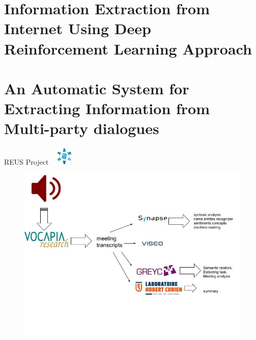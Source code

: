 \documentclass{beamer}
\begin{document}
\begin{frame}\frametitle{}

\end{frame}

\section{Information Extraction from Internet Using Deep Reinforcement Learning Approach}
\begin{frame}

\end{frame}

\begin{frame}

\end{frame}

\section{An Automatic System for Extracting Information from Multi-party dialogues}
\begin{frame}{REUS Project \hspace*{7.1cm}~ \includegraphics[width=0.8cm]{images/reus.png}}

\begin{figure}
\includegraphics[width=12cm]{images/reus-.jpg}
\end{figure}

\end{frame}
\end{document}
